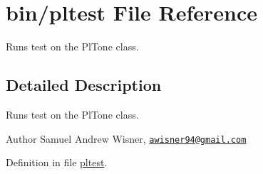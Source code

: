 \hypertarget{pltest}{\section{bin/pltest File Reference}
\label{pltest}
}


Runs test on the Pl\+Tone class.  




\subsection{Detailed Description}
Runs test on the Pl\+Tone class. 

\begin{DoxyAuthor}{Author}
Samuel Andrew Wisner, \href{mailto:awisner94@gmail.com}{\tt awisner94@gmail.\+com} 
\end{DoxyAuthor}


Definition in file \hyperlink{pltest_source}{pltest}.

